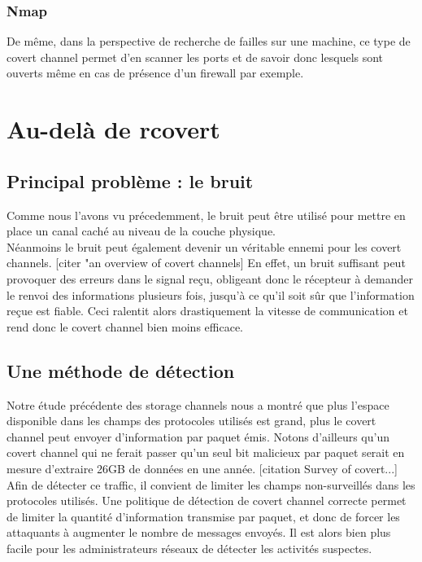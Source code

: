 \documentclass{acm_proc_article-sp}
\begin{document}
\subsubsection{Nmap}
De même, dans la perspective de recherche de failles sur une machine, ce type de covert channel permet d'en scanner les ports et de savoir donc lesquels sont ouverts même en cas de présence d'un firewall par exemple.


\section{Au-delà de rcovert}

\subsection{Principal problème : le bruit}
Comme nous l'avons vu précedemment, le bruit peut être utilisé pour mettre en place un canal caché au niveau de la couche physique.\\
Néanmoins le bruit peut également devenir un véritable ennemi pour les covert channels.
[citer "an overview of covert channels]
En effet, un bruit suffisant peut provoquer des erreurs dans le signal reçu, obligeant donc le récepteur à demander le renvoi des informations plusieurs fois, jusqu'à ce qu'il soit sûr que l'information reçue est fiable. Ceci ralentit alors drastiquement la vitesse de communication et rend donc le covert channel bien moins efficace.

\subsection{Une méthode de détection}
Notre étude précédente des storage channels nous a montré que plus l'espace disponible dans les champs des protocoles utilisés est grand, plus le covert channel peut envoyer d'information par paquet émis. Notons d'ailleurs qu'un covert channel qui ne ferait passer qu'un seul bit malicieux par paquet serait en mesure d'extraire 26GB de données en une année. [citation Survey of covert...]\\
Afin de détecter ce traffic, il convient de limiter les champs non-surveillés dans les protocoles utilisés. Une politique de détection de covert channel correcte permet de limiter la quantité d'information transmise par paquet, et donc de forcer les attaquants à augmenter le nombre de messages envoyés. Il est alors bien plus facile pour les administrateurs réseaux de détecter les activités suspectes.
\end{document}
